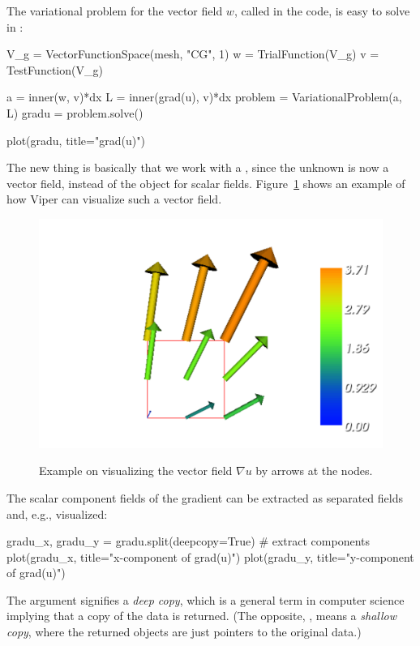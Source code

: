 The variational problem for the vector field $w$, called
 in the code, is easy to solve in
\fenics:
\begin{python}
V_g = VectorFunctionSpace(mesh, "CG", 1)
w = TrialFunction(V_g)
v = TestFunction(V_g)

a = inner(w, v)*dx
L = inner(grad(u), v)*dx
problem = VariationalProblem(a, L)
gradu = problem.solve()

plot(gradu, title="grad(u)")
\end{python}
The new thing is basically that we work with a
, since the unknown
is now a vector field, instead of the
 object for scalar
fields.
Figure~\ref{tut:poisson:2D:fig:ex1:gradu} shows
an example of how Viper can visualize such a vector field.

\begin{figure}
  \begin{center}
    \label{tut:poisson:2D:fig:ex1:gradu}
    \includegraphics[width=\largefig]{chapters/langtangen/pdf/ex1_gradu.pdf}
    \caption{Example on visualizing the vector field
      $\nabla u$ by arrows at the nodes.}
  \end{center}
\end{figure}

The scalar component fields of the gradient
can be extracted as separated fields and, e.g., visualized:
\begin{python}
gradu_x, gradu_y = gradu.split(deepcopy=True)  # extract components
plot(gradu_x, title="x-component of grad(u)")
plot(gradu_y, title="y-component of grad(u)")
\end{python}
The  argument signifies a \emph{deep copy}, which is
a general term in computer science implying that a copy of the data is
returned. (The opposite, ,
means a \emph{shallow copy}, where
the returned objects are just pointers to the original data.)

